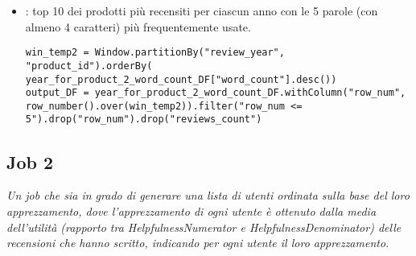 \begin{itemize}
    \item {}: top 10 dei prodotti più recensiti per ciascun anno con le 5 parole (con almeno 4 caratteri) più frequentemente usate.
     \begin{lstlisting}[style=all, style=PythonStyle]
win_temp2 = Window.partitionBy("review_year", "product_id").orderBy( year_for_product_2_word_count_DF["word_count"].desc())
output_DF = year_for_product_2_word_count_DF.withColumn("row_num", row_number().over(win_temp2)).filter("row_num <= 5").drop("row_num").drop("reviews_count")
\end{lstlisting}
  \end{itemize}


\newpage
\subsection{Job 2}
\textit{Un job che sia in grado di generare una lista di utenti ordinata sulla base del loro apprezzamento, dove l’apprezzamento di ogni utente è ottenuto dalla media dell’utilità (rapporto tra HelpfulnessNumerator e HelpfulnessDenominator) delle recensioni che hanno scritto, indicando per ogni utente il loro apprezzamento.}

